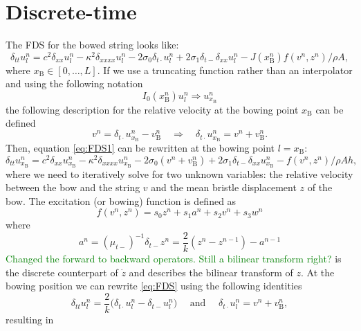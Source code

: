 \documentclass{article}
\def\SWcomment[#1]{\textcolor{Green}{#1}}
\begin{document}
\section{Discrete-time}
The FDS for the bowed string looks like:
\begin{equation}\label{eq:FDS1}
    \delta_{tt} u_l^n =c^2 \delta_{xx} u_l^n -\kappa^2\delta_{xxxx} u_l^n - 2\sigma_0\delta_{t\cdot} u_l^n
    + 2\sigma_1\delta_{t-}\delta_{xx}u_l^n - J(x_\text{B}^n)f(v^n, z^n)/\rho A,
\end{equation}
where $x_\text{B} \in [0,\hdots, L]$. If we use a truncating function rather than an interpolator and using the following notation
\begin{equation}
    I_0(x_\text{B}^n)u^n_l \Rightarrow u^n_{x_\text{B}}
\end{equation}
the following description for the relative velocity at the bowing point $x_\text{B}$ can be defined
\begin{equation}
    v^n = \delta_{t\cdot}u^n_{x_\text{B}} - v_\text{B}^n \quad \Rightarrow \quad \delta_{t\cdot}u^n_{x_\text{B}} = v^n + v_\text{B}^n.
\end{equation}
Then, equation \eqref{eq:FDS1} can be rewritten at the bowing point $l=x_\text{B}$:
\begin{equation}
\label{eq:FDS}
\delta_{tt} u_{x_\text{B}}^n =c^2 \delta_{xx} u_{x_\text{B}}^n -\kappa^2\delta_{xxxx} u_{x_\text{B}}^n - 2\sigma_0(v^n + v_\text{B}^n)
+ 2\sigma_1\delta_{t-}\delta_{xx}u_{x_\text{B}}^n - f(v^n, z^n)/\rho Ah,
\end{equation}
where we need to iteratively solve for two unknown variables: the relative velocity between the bow and the string $v$ and the mean bristle displacement $z$ of the bow.
The excitation (or bowing) function is defined as
\begin{equation}
    f(v^n, z^n) = s_0z^n + s_1 a^n + s_2v^n + s_3w^n
\end{equation}
where 
\begin{equation}\label{eq:an}
    a^n = (\mu_{t-})^{-1}\delta_{t-}z^n = \frac{2}{k}(z^n-z^{n-1})-a^{n-1}
\end{equation} \SWcomment[Changed the forward to backward operators. Still a bilinear transform right?]{}
is the discrete counterpart of $\dot{z}$ and describes the bilinear transform of $z$. 
At the bowing position we can rewrite \eqref{eq:FDS} using the following identities
\begin{equation}
    \delta_{tt}u_l^n = \frac{2}{k}\big(\delta_{t\cdot}u_l^n-\delta_{t-}u_l^n\big) \quad \text{ and } \quad \delta_{t\cdot}u_l^n = v^n + v_\text{B}^n,
\end{equation}
resulting in 
\end{document}

